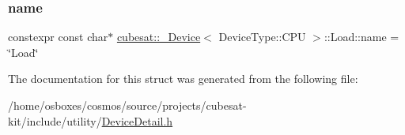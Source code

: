 \subsubsection{\texorpdfstring{name}{name}}
{\footnotesize\ttfamily constexpr const char$\ast$ \hyperlink{structcubesat_1_1__Device}{cubesat\+::\+\_\+\+Device}$<$ Device\+Type\+::\+C\+PU $>$\+::Load\+::name = \char`\"{}Load\char`\"{}\hspace{0.3cm}{\ttfamily [static]}}



The documentation for this struct was generated from the following file\+:\begin{DoxyCompactItemize}
\item 
/home/osboxes/cosmos/source/projects/cubesat-\/kit/include/utility/\hyperlink{DeviceDetail_8h}{Device\+Detail.\+h}\end{DoxyCompactItemize}
